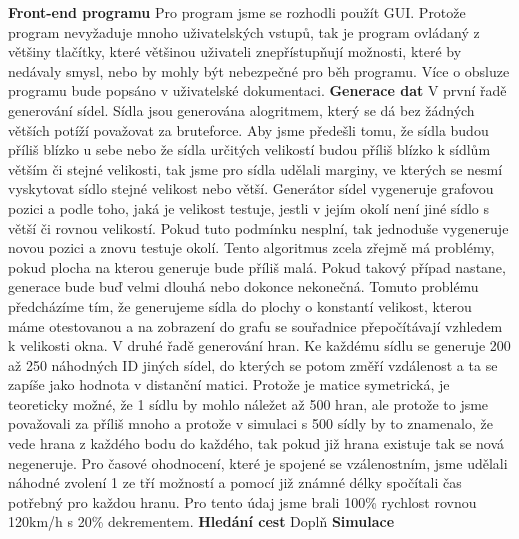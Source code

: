 \documentclass[ 12pt, a4paper]{report}
\begin{document}
{\large\bf Front-end programu}\newline
Pro program jsme se rozhodli použít GUI. Protože program nevyžaduje mnoho uživatelských vstupů, tak je program ovládaný z většiny tlačítky, které většinou uživateli znepřístupňují možnosti, které by nedávaly smysl, nebo by mohly být nebezpečné pro běh programu. Více o obsluze programu bude popsáno v uživatelské dokumentaci.\newline\newline
{\large\bf Generace dat}\newline
V první řadě generování sídel. Sídla jsou generována alogritmem, který se dá bez žádných větších potíží považovat za bruteforce. Aby jsme předešli tomu, že sídla budou příliš blízko u sebe nebo že sídla určitých velikostí budou příliš blízko k sídlům větším či stejné velikosti, tak jsme pro sídla udělali marginy, ve kterých se nesmí vyskytovat sídlo stejné velikost nebo větší. Generátor sídel vygeneruje grafovou pozici a podle toho, jaká je velikost testuje, jestli v jejím okolí není jiné sídlo s větší či rovnou velikostí. Pokud tuto podmínku nesplní, tak jednoduše vygeneruje novou pozici a znovu testuje okolí. Tento algoritmus zcela zřejmě má problémy, pokud plocha na kterou generuje bude příliš malá. Pokud takový případ nastane, generace bude buď velmi dlouhá nebo dokonce nekonečná. Tomuto problému předcházíme tím, že generujeme sídla do plochy o konstantí velikost, kterou máme otestovanou a na zobrazení do grafu se souřadnice přepočítávají vzhledem k velikosti okna.\newline
V druhé řadě generování hran. Ke každému sídlu se generuje 200 až 250 náhodných ID jiných sídel, do kterých se potom změří vzdálenost a ta se zapíše jako hodnota v distanční matici. Protože je matice symetrická, je teoreticky možné, že 1 sídlu by mohlo náležet až 500 hran, ale protože to jsme považovali za příliš mnoho a protože v simulaci s 500 sídly by to znamenalo, že vede hrana z každého bodu do každého, tak pokud již hrana existuje tak se nová negeneruje. Pro časové ohodnocení, které je spojené se vzálenostním, jsme udělali náhodné zvolení 1 ze tří možností a pomocí již známné délky spočítali čas potřebný pro každou hranu. Pro tento údaj jsme brali 100\% rychlost rovnou 120km/h s 20\% dekrementem.\newline\newline
{\large\bf Hledání cest}\newline
Doplň\newline\newline
{\large\bf Simulace}\newline
\end{document}
